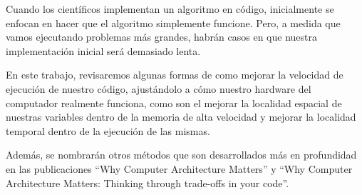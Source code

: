 Cuando los científicos implementan un algoritmo en código, inicialmente se enfocan en hacer que el
algoritmo simplemente funcione. Pero, a medida que vamos ejecutando problemas más grandes, habrán casos
en que nuestra implementación inicial será demasiado lenta.

En este trabajo, revisaremos algunas formas de como mejorar la velocidad de ejecución de nuestro código,
ajustándolo a cómo nuestro hardware del computador realmente funciona, como son el mejorar la localidad
espacial de nuestras variables dentro de la memoria de alta velocidad y mejorar la localidad temporal
dentro de la ejecución de las mismas.

Además, se nombrarán otros métodos que son desarrollados más en profundidad en las publicaciones ``Why
Computer Architecture Matters''\cite{wcam-1} y ``Why Computer Architecture Matters: Thinking through
trade-offs in your code''\cite{wcam-3}.
